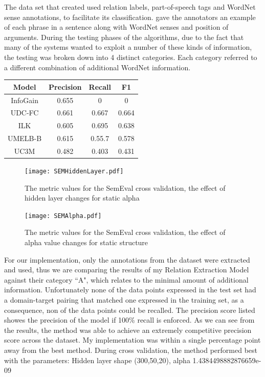 \documentclass[12pt]{article} %
\begin{document}
The data set that \cite{nastase2006learning} created used relation labels, part-of-speech tags and WordNet sense annotations, to facilitate its classification. \cite{moldovan2004models}\cite{girju2005semantics} gave the annotators an example of each phrase in a sentence along with WordNet senses and position of arguments. During the testing phases of the algorithms, due to the fact that many of the systems wanted to exploit a number of these kinds of information, the testing was broken down into 4 distinct categories. Each category referred to a different combination of additional WordNet information.


\begin{center}
 \begin{tabular}{||c c c c||} 
 \hline
 Model & Precision & Recall & F1 \\ [0.5ex] 
 \hline\hline
 InfoGain & 0.655 & 0 & 0 \\ 
 \hline
 UDC-FC & 0.661 & 0.667 & 0.664 \\
 \hline
 ILK & 0.605 & 0.695 & 0.638 \\
 \hline
 UMELB-B & 0.615 & 0.55.7 & 0.578 \\
 \hline
 UC3M & 0.482 & 0.403 & 0.431 \\ [1ex] 
 \hline
\end{tabular}
\end{center}

\begin{figure}
\centering
\texttt{[image: SEMHiddenLayer.pdf]}
\caption{The metric values for the SemEval cross validation, the effect of hidden layer changes for static alpha}
\end{figure}

\begin{figure}
\centering
\texttt{[image: SEMAlpha.pdf]}
\caption{The metric values for the SemEval cross validation, the effect of alpha value changes for static structure}
\end{figure}

For our implementation, only the annotations from the dataset were extracted and used, thus we are comparing the results of my Relation Extraction Model against their category ``A", which relates to the minimal amount of additional information. Unfortunately none of the data points expressed in the test set had a domain-target pairing that matched one expressed in the training set, as a consequence, non of the data points could be recalled. The precision score listed showes the precision of the model if 100\% recall is enforced. As we can see from the results, the method was able to achieve an extremely competitive precision score across the dataset. My implementation was within a single percentage point away from the best method. During cross validation, the method performed best with the parameters: Hidden layer shape (300,50,20), alpha 1.4384498882876659e-09
\end{document}
